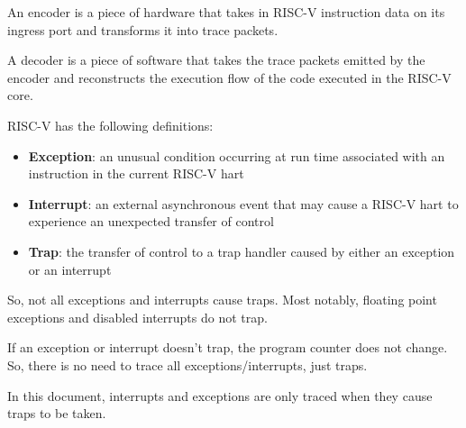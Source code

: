 An encoder is a piece of hardware that takes in RISC-V instruction data
on its ingress port and transforms it into trace packets.

A decoder is a piece of software that takes the trace packets emitted by the
encoder and reconstructs the execution flow of the code executed in the RISC-V core.

RISC-V has the following definitions:
\begin{itemize}
  \item
    \textbf{Exception}: an unusual condition occurring at run time associated with an instruction in the current RISC-V hart
  \item
    \textbf{Interrupt}: an external asynchronous event that may cause a RISC-V hart to experience an unexpected transfer of control
  \item
    \textbf{Trap}: the transfer of control to a trap handler caused by either an exception or an interrupt
\end{itemize}
So, not all exceptions and interrupts cause traps. Most notably, floating point exceptions and disabled interrupts do not trap.

If an exception or interrupt doesn't trap, the program counter does not
change. So, there is no need to trace all exceptions/interrupts, just
traps.

In this document, interrupts and exceptions are only traced when they cause traps to be taken.
